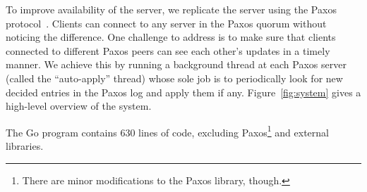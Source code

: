 To improve availability of the server, we replicate the server using the Paxos
protocol~\cite{lamport1998part}. Clients can connect to any server in the Paxos
quorum without noticing the difference. One challenge to address is to make sure
that clients connected to different Paxos peers can see each other's updates in
a timely manner. We achieve this by running a background thread at each Paxos
server (called the ``auto-apply'' thread) whose sole job is to periodically look
for new decided entries in the Paxos log and apply them if any.
Figure~\ref{fig:system} gives a high-level overview of the system.

The Go program contains 630 lines of code, excluding Paxos\footnote{There are
minor modifications to the Paxos library, though.} and external libraries.
